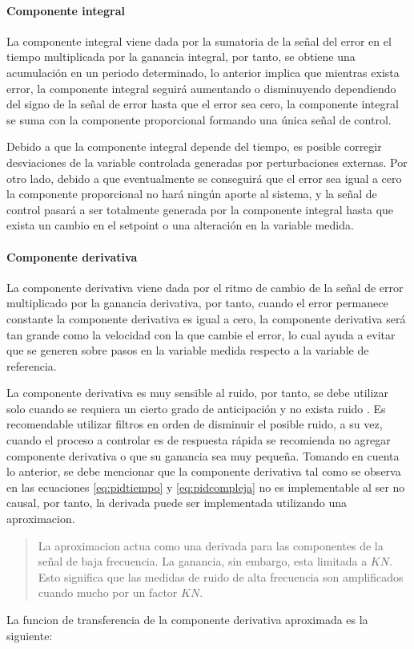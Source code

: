 			\paragraph{Componente integral}

				La componente integral viene dada por la sumatoria de la señal del error en el tiempo multiplicada por la ganancia integral, por tanto, se obtiene una acumulación en un periodo determinado, lo anterior implica que mientras exista error, la componente integral seguirá aumentando o disminuyendo dependiendo del signo de la señal de error hasta que el error sea cero, la componente integral se suma con la componente proporcional formando una única señal de control.

				Debido a que la componente integral depende del tiempo, es posible corregir desviaciones de la variable controlada generadas por perturbaciones externas. Por otro lado, debido a que eventualmente se conseguirá que el error sea igual a cero la componente proporcional no hará ningún aporte al sistema, y la señal de control pasará a ser totalmente generada por la componente integral hasta que exista un cambio en el setpoint o una alteración en la variable medida.

			\paragraph{Componente derivativa}

				La componente derivativa viene dada por el ritmo de cambio de la señal de error multiplicado por la ganancia derivativa, por tanto, cuando el error permanece constante la componente derivativa es igual a cero, la componente derivativa será tan grande como la velocidad con la que cambie el error, lo cual ayuda a evitar que se generen sobre pasos en la variable medida respecto a la variable de referencia.
				
				La componente derivativa es muy sensible al ruido, por tanto, se debe utilizar solo cuando se requiera un cierto grado de anticipación y no exista ruido \Parencite{smith1985principles}. Es recomendable utilizar filtros en orden de disminuir el posible ruido, a su vez, cuando el proceso a controlar es de respuesta rápida se recomienda no agregar componente derivativa o que su ganancia sea muy pequeña. Tomando en cuenta lo anterior, se debe mencionar que la componente derivativa tal como se observa en las ecuaciones \cref{eq:pidtiempo} y \cref{eq:pidcompleja} no es implementable al ser no causal, por tanto, la derivada puede ser implementada utilizando una aproximacion. \blockquote[{\cite[p.220]{aastrom2002control}}]{La aproximacion actua como una derivada para las componentes de la señal de baja frecuencia. La ganancia, sin embargo, esta limitada a $KN$. Esto significa que las medidas de ruido de alta frecuencia son amplificados cuando mucho por un factor $KN$.} La funcion de transferencia de la componente derivativa aproximada es la siguiente:

